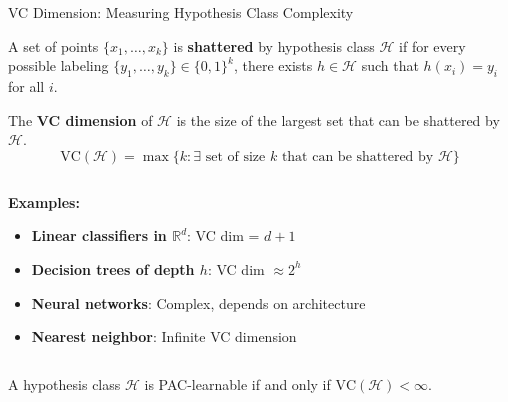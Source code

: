 \documentclass[aspectratio=169,11pt]{beamer}
\newcommand{\Real}{\mathbb{R}}
\begin{document}
\begin{frame}{VC Dimension: Measuring Hypothesis Class Complexity}
\begin{definition}[Shattering]
A set of points $\{x_1, \ldots, x_k\}$ is \textbf{shattered} by hypothesis class $\mathcal{H}$ if for every possible labeling $\{y_1, \ldots, y_k\} \in \{0,1\}^k$, there exists $h \in \mathcal{H}$ such that $h(x_i) = y_i$ for all $i$.
\end{definition}

\begin{definition}[VC Dimension]
The \textbf{VC dimension} of $\mathcal{H}$ is the size of the largest set that can be shattered by $\mathcal{H}$.
\[\text{VC}(\mathcal{H}) = \max\{k : \exists \text{ set of size } k \text{ that can be shattered by } \mathcal{H}\}\]
\end{definition}

\begin{columns}
\begin{column}{0.5\textwidth}
\textbf{Examples:}

\begin{itemize}
\item \textbf{Linear classifiers in $\Real^d$}: VC dim = $d + 1$
\item \textbf{Decision trees of depth $h$}: VC dim $\approx 2^h$
\item \textbf{Neural networks}: Complex, depends on architecture
\item \textbf{Nearest neighbor}: Infinite VC dimension
\end{itemize}
\end{column}
\begin{column}{0.5\textwidth}
\begin{figure}
\centering
{}
\end{figure}
\end{column}
\end{columns}

\begin{theorem}
A hypothesis class $\mathcal{H}$ is PAC-learnable if and only if $\text{VC}(\mathcal{H}) < \infty$.
\end{theorem}
\end{frame}
\end{document}
